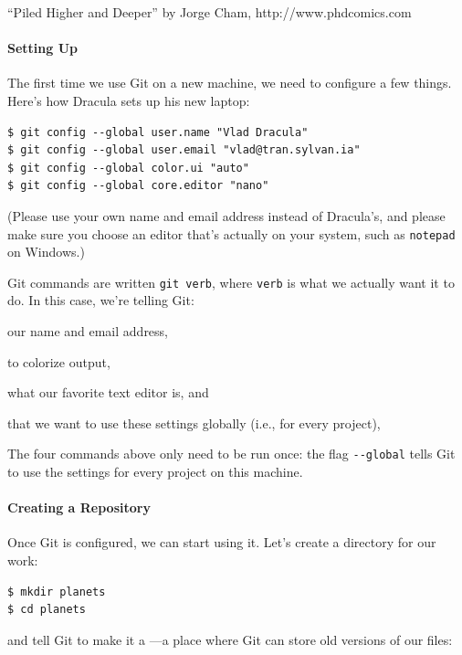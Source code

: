 \documentclass{book}
\begin{document}
``Piled Higher and Deeper'' by Jorge Cham, http://www.phdcomics.com

\mbox{}\paragraph{Setting Up}

The first time we use Git on a new machine, we need to configure a few
things. Here's how Dracula sets up his new laptop:

\begin{verbatim}
$ git config --global user.name "Vlad Dracula"
$ git config --global user.email "vlad@tran.sylvan.ia"
$ git config --global color.ui "auto"
$ git config --global core.editor "nano"
\end{verbatim}

(Please use your own name and email address instead of Dracula's, and
please make sure you choose an editor that's actually on your system,
such as \texttt{notepad} on Windows.)

Git commands are written \texttt{git verb}, where \texttt{verb} is what
we actually want it to do. In this case, we're telling Git:

\begin{swcitemize}
\item
  our name and email address,
\item
  to colorize output,
\item
  what our favorite text editor is, and
\item
  that we want to use these settings globally (i.e., for every project),
\end{swcitemize}

The four commands above only need to be run once: the flag
\texttt{-{}-global} tells Git to use the settings for every project on
this machine.

\mbox{}\paragraph{Creating a Repository}

Once Git is configured, we can start using it. Let's create a directory
for our work:

\begin{verbatim}
$ mkdir planets
$ cd planets
\end{verbatim}

and tell Git to make it a ---a place
where Git can store old versions of our files:
\end{document}
